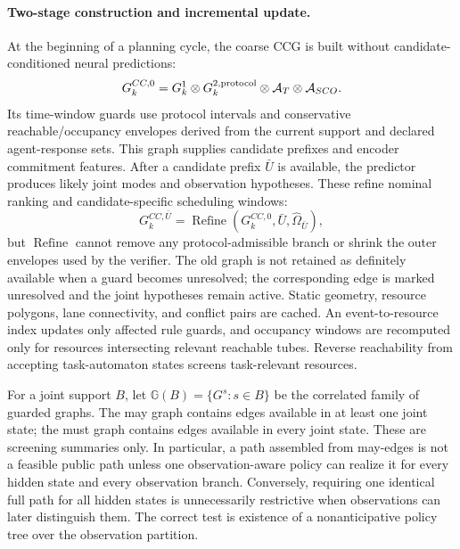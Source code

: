 \documentclass[letterpaper]{article} %
\begin{document}
\paragraph{Two-stage construction and incremental update.}
At the beginning of a planning cycle, the coarse CCG is built without candidate-conditioned neural predictions:
\begin{equation}
G_{k}^{CC,0}=
G_k^1\otimes G_k^{2,{\rm protocol}}
\otimes\mathcal A_T\otimes\mathcal A_{SCO}.
\label{eq:ccg-coarse}
\end{equation}
Its time-window guards use protocol intervals and conservative reachable/occupancy envelopes derived from the current support and declared agent-response sets. This graph supplies candidate prefixes and encoder commitment features. After a candidate prefix $\bar U$ is available, the predictor produces likely joint modes and observation hypotheses. These refine nominal ranking and candidate-specific scheduling windows:
\begin{equation}
G_k^{CC,\bar U}=
\operatorname{Refine}(G_k^{CC,0},\bar U,\widehat\Omega_{\bar U}),
\label{eq:ccg-refine}
\end{equation}
but $\operatorname{Refine}$ cannot remove any protocol-admissible branch or shrink the outer envelopes used by the verifier. The old graph is not retained as definitely available when a guard becomes unresolved; the corresponding edge is marked unresolved and the joint hypotheses remain active. Static geometry, resource polygons, lane connectivity, and conflict pairs are cached. An event-to-resource index updates only affected rule guards, and occupancy windows are recomputed only for resources intersecting relevant reachable tubes. Reverse reachability from accepting task-automaton states screens task-relevant resources.

For a joint support $B$, let $\mathbb G(B)=\{G^s:s\in B\}$ be the correlated family of guarded graphs. The may graph contains edges available in at least one joint state; the must graph contains edges available in every joint state. These are screening summaries only. In particular, a path assembled from may-edges is not a feasible public path unless one observation-aware policy can realize it for every hidden state and every observation branch. Conversely, requiring one identical full path for all hidden states is unnecessarily restrictive when observations can later distinguish them. The correct test is existence of a nonanticipative policy tree over the observation partition.
\end{document}
